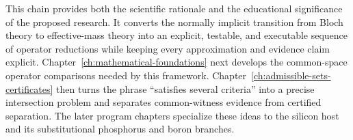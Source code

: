 This chain provides both the scientific rationale and the educational
significance of the proposed research. It converts the normally implicit
transition from Bloch theory to effective-mass theory into an explicit,
testable, and executable sequence of operator reductions while keeping every
approximation and evidence claim explicit.
Chapter~\ref{ch:mathematical-foundations} next develops the common-space
operator comparisons needed by this framework.
Chapter~\ref{ch:admissible-sets-certificates} then turns the phrase
``satisfies several criteria'' into a precise intersection problem and
separates common-witness evidence from certified separation. The later program
chapters specialize these ideas to the silicon host and its substitutional
phosphorus and boron branches.
